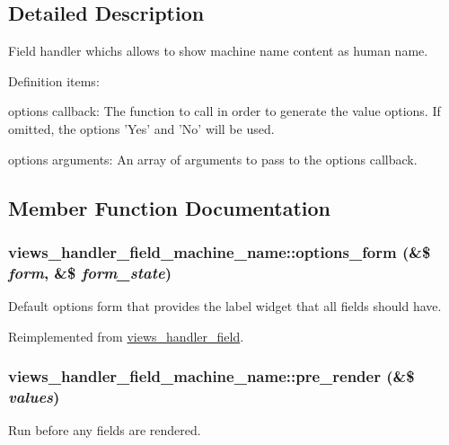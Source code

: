 \subsection{Detailed Description}
Field handler whichs allows to show machine name content as human name.

Definition items:
\begin{DoxyItemize}
\item options callback: The function to call in order to generate the value options. If omitted, the options 'Yes' and 'No' will be used.
\item options arguments: An array of arguments to pass to the options callback. 
\end{DoxyItemize}

\subsection{Member Function Documentation}
\hypertarget{classviews__handler__field__machine__name_adb13ceea9d5b358c87dad564b36078f7}{
\subsubsection[{options\_\-form}]{\setlength{\rightskip}{0pt plus 5cm}views\_\-handler\_\-field\_\-machine\_\-name::options\_\-form (\&\$ {\em form}, \/  \&\$ {\em form\_\-state})}}
\label{classviews__handler__field__machine__name_adb13ceea9d5b358c87dad564b36078f7}
Default options form that provides the label widget that all fields should have. 

Reimplemented from \hyperlink{classviews__handler__field_a0435d161922b7b4b84f02a2e79bb947a}{views\_\-handler\_\-field}.\hypertarget{classviews__handler__field__machine__name_a59f0fefb006bc18fd3bd357df1fb75fa}{
\subsubsection[{pre\_\-render}]{\setlength{\rightskip}{0pt plus 5cm}views\_\-handler\_\-field\_\-machine\_\-name::pre\_\-render (\&\$ {\em values})}}
\label{classviews__handler__field__machine__name_a59f0fefb006bc18fd3bd357df1fb75fa}
Run before any fields are rendered.

